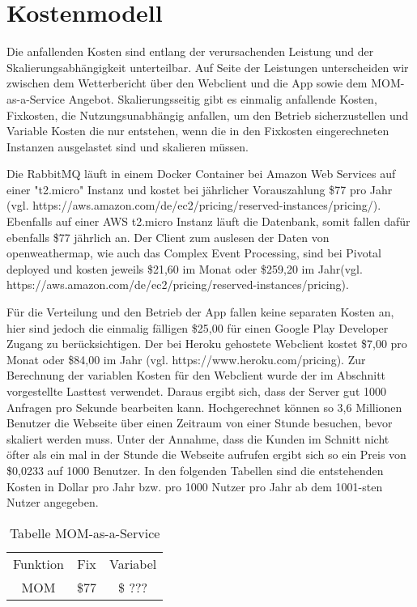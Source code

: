 \section{Kostenmodell}
Die anfallenden Kosten sind entlang der verursachenden Leistung und der Skalierungsabhängigkeit unterteilbar. Auf Seite der Leistungen unterscheiden wir zwischen dem Wetterbericht über den Webclient und die App sowie dem MOM-as-a-Service Angebot. Skalierungsseitig gibt es einmalig anfallende Kosten, Fixkosten, die Nutzungsunabhängig anfallen, um den Betrieb sicherzustellen und Variable Kosten die nur entstehen, wenn die in den Fixkosten eingerechneten Instanzen ausgelastet sind und skalieren müssen.

Die RabbitMQ läuft in einem Docker Container bei Amazon Web Services auf einer "t2.micro" Instanz und kostet bei jährlicher Vorauszahlung \$77 pro Jahr (vgl. https://aws.amazon.com/de/ec2/pricing/reserved-instances/pricing/). Ebenfalls auf einer AWS t2.micro Instanz läuft die Datenbank, somit fallen dafür ebenfalls \$77 jährlich an. Der Client zum auslesen der Daten von openweathermap, wie auch das Complex Event Processing, sind bei Pivotal deployed und kosten jeweils \$21,60 im Monat oder \$259,20 im Jahr(vgl. https://aws.amazon.com/de/ec2/pricing/reserved-instances/pricing). 


Für die Verteilung und den Betrieb der App fallen keine separaten Kosten an, hier sind jedoch die einmalig fälligen \$25,00 für einen Google Play Developer Zugang zu berücksichtigen. Der bei Heroku gehostete Webclient kostet \$7,00 pro Monat oder \$84,00 im Jahr (vgl. https://www.heroku.com/pricing). Zur Berechnung der variablen Kosten für den Webclient wurde der im Abschnitt  vorgestellte Lasttest verwendet. Daraus ergibt sich, dass der Server gut 1000 Anfragen pro Sekunde bearbeiten kann. Hochgerechnet können so 3,6 Millionen Benutzer die Webseite über einen Zeitraum von einer Stunde besuchen, bevor skaliert werden muss. Unter der Annahme, dass die Kunden im Schnitt nicht öfter als ein mal in der Stunde die Webseite aufrufen ergibt sich so ein Preis von \$0,0233 auf 1000 Benutzer. In den folgenden Tabellen sind die entstehenden Kosten in Dollar pro Jahr bzw. pro 1000 Nutzer pro Jahr ab dem 1001-sten Nutzer angegeben.

\begin{table}
\caption{Tabelle MOM-as-a-Service}
\centering
\begin{tabular}{ccc}
	Funktion & Fix & Variabel \\
	MOM & \$77 & \$ ??? \\
\end{tabular}
\end{table}

